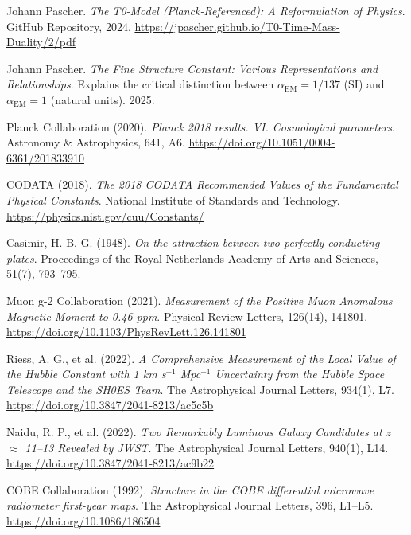 \documentclass[12pt,a4paper]{article}
\theoremstyle{definition}
\theoremstyle{remark}
\begin{document}
	\begin{thebibliography}{20}
		Johann Pascher.
		\textit{The T0-Model (Planck-Referenced): A Reformulation of Physics}.
		GitHub Repository, 2024.
		\url{https://jpascher.github.io/T0-Time-Mass-Duality/2/pdf}
		
		Johann Pascher.
		\textit{The Fine Structure Constant: Various Representations and Relationships}.
		Explains the critical distinction between $\alpha_{\text{EM}} = 1/137$ (SI) and $\alpha_{\text{EM}} = 1$ (natural units).
		2025.
		
		Planck Collaboration (2020). 
		\textit{Planck 2018 results. VI. Cosmological parameters}. 
		Astronomy \& Astrophysics, 641, A6. 
		\url{https://doi.org/10.1051/0004-6361/201833910}
		
		CODATA (2018). 
		\textit{The 2018 CODATA Recommended Values of the Fundamental Physical Constants}. 
		National Institute of Standards and Technology. 
		\url{https://physics.nist.gov/cuu/Constants/}
		
		Casimir, H. B. G. (1948). 
		\textit{On the attraction between two perfectly conducting plates}. 
		Proceedings of the Royal Netherlands Academy of Arts and Sciences, 51(7), 793--795.
		
		Muon g-2 Collaboration (2021). 
		\textit{Measurement of the Positive Muon Anomalous Magnetic Moment to 0.46 ppm}. 
		Physical Review Letters, 126(14), 141801. 
		\url{https://doi.org/10.1103/PhysRevLett.126.141801}
		
		Riess, A. G., et al. (2022). 
		\textit{A Comprehensive Measurement of the Local Value of the Hubble Constant with 1 km s$^{-1}$ Mpc$^{-1}$ Uncertainty from the Hubble Space Telescope and the SH0ES Team}. 
		The Astrophysical Journal Letters, 934(1), L7. 
		\url{https://doi.org/10.3847/2041-8213/ac5c5b}
		
		Naidu, R. P., et al. (2022). 
		\textit{Two Remarkably Luminous Galaxy Candidates at z $\approx$ 11--13 Revealed by JWST}. 
		The Astrophysical Journal Letters, 940(1), L14. 
		\url{https://doi.org/10.3847/2041-8213/ac9b22}
		
		COBE Collaboration (1992). 
		\textit{Structure in the COBE differential microwave radiometer first-year maps}. 
		The Astrophysical Journal Letters, 396, L1--L5. 
		\url{https://doi.org/10.1086/186504}
	\end{thebibliography}
	
\end{document}
